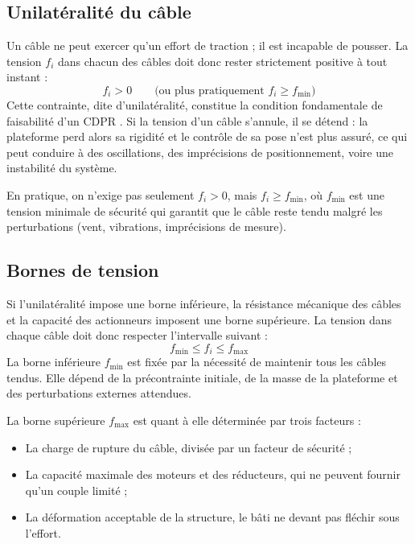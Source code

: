 \subsection{Unilatéralité du câble}

Un câble ne peut exercer qu'un effort de traction ; il est incapable de pousser. La tension $f_i$ dans chacun des câbles doit donc rester strictement positive à tout instant :
\begin{equation}
f_i > 0 \qquad \text{(ou plus pratiquement } f_i \ge f_{\min}\text{)}
\label{eq:unilateralite}
\end{equation}
Cette contrainte, dite d'unilatéralité, constitue la condition fondamentale de faisabilité d'un CDPR \cite{tho2022}. Si la tension d'un câble s'annule, il se détend : la plateforme perd alors sa rigidité et le contrôle de sa pose n'est plus assuré, ce qui peut conduire à des oscillations, des imprécisions de positionnement, voire une instabilité du système.

En pratique, on n'exige pas seulement $f_i > 0$, mais $f_i \ge f_{\min}$, où $f_{\min}$ est une tension minimale de sécurité qui garantit que le câble reste tendu malgré les perturbations (vent, vibrations, imprécisions de mesure).

\subsection{Bornes de tension}

Si l'unilatéralité impose une borne inférieure, la résistance mécanique des câbles et la capacité des actionneurs imposent une borne supérieure. La tension dans chaque câble doit donc respecter l'intervalle suivant :
\begin{equation}
f_{\min} \le f_i \le f_{\max}
\label{eq:bornes}
\end{equation}
La borne inférieure $f_{\min}$ est fixée par la nécessité de maintenir tous les câbles tendus. Elle dépend de la précontrainte initiale, de la masse de la plateforme et des perturbations externes attendues.

La borne supérieure $f_{\max}$ est quant à elle déterminée par trois facteurs :
\begin{itemize}
\item La charge de rupture du câble, divisée par un facteur de sécurité ;
\item La capacité maximale des moteurs et des réducteurs, qui ne peuvent fournir qu'un couple limité ;
\item La déformation acceptable de la structure, le bâti ne devant pas fléchir sous l'effort.
\end{itemize}

